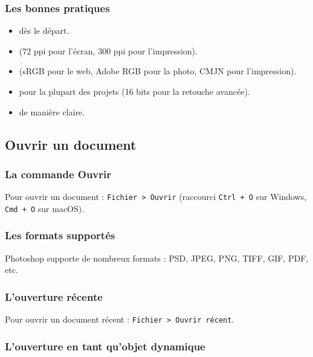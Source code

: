 \subsubsection{Les bonnes pratiques}

\begin{itemize}
    \item {} dès le départ.
    \item {} (72 ppi pour l'écran, 300 ppi pour l'impression).
    \item {} (sRGB pour le web, Adobe RGB pour la photo, CMJN pour l'impression).
    \item {} pour la plupart des projets (16 bits pour la retouche avancée).
    \item {} de manière claire.
\end{itemize}

\subsection{Ouvrir un document}

\subsubsection{La commande Ouvrir}

Pour ouvrir un document : \texttt{Fichier > Ouvrir} (raccourci \texttt{Ctrl + O} sur Windows, \texttt{Cmd + O} sur macOS).

\subsubsection{Les formats supportés}

Photoshop supporte de nombreux formats : PSD, JPEG, PNG, TIFF, GIF, PDF, etc.

\subsubsection{L'ouverture récente}

Pour ouvrir un document récent : \texttt{Fichier > Ouvrir récent}.

\subsubsection{L'ouverture en tant qu'objet dynamique}

